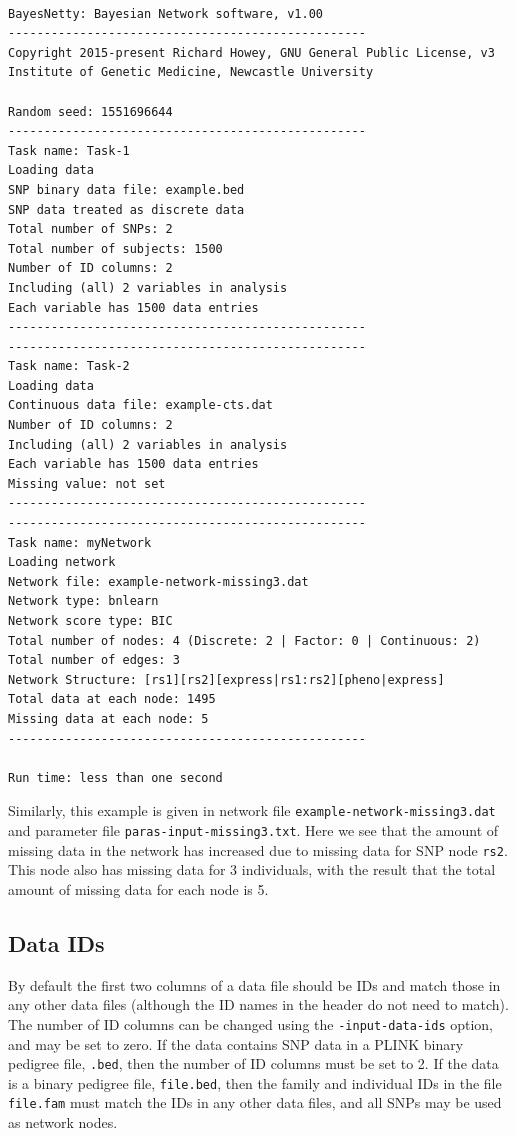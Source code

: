 \documentclass[a4paper,12pt]{article}
\newcommand{\code}[1]{{\footnotesize{{\tt #1}}}}
\begin{document}
\vspace{0.35cm} \begin{lstlisting}

BayesNetty: Bayesian Network software, v1.00
--------------------------------------------------
Copyright 2015-present Richard Howey, GNU General Public License, v3
Institute of Genetic Medicine, Newcastle University

Random seed: 1551696644
--------------------------------------------------
Task name: Task-1
Loading data
SNP binary data file: example.bed
SNP data treated as discrete data
Total number of SNPs: 2
Total number of subjects: 1500
Number of ID columns: 2
Including (all) 2 variables in analysis
Each variable has 1500 data entries
--------------------------------------------------
--------------------------------------------------
Task name: Task-2
Loading data
Continuous data file: example-cts.dat
Number of ID columns: 2
Including (all) 2 variables in analysis
Each variable has 1500 data entries
Missing value: not set
--------------------------------------------------
--------------------------------------------------
Task name: myNetwork
Loading network
Network file: example-network-missing3.dat
Network type: bnlearn
Network score type: BIC
Total number of nodes: 4 (Discrete: 2 | Factor: 0 | Continuous: 2)
Total number of edges: 3
Network Structure: [rs1][rs2][express|rs1:rs2][pheno|express]
Total data at each node: 1495
Missing data at each node: 5
--------------------------------------------------

Run time: less than one second

\end{lstlisting} \vspace{0.35cm}
Similarly, this example is given in network file \code{example-network-missing3.dat} and parameter file \code{paras-input-missing3.txt}. Here we see that the amount of missing data in the network has increased due to missing data for SNP node \code{rs2}. This node also has missing data for 3 individuals, with the result that the total amount of missing data for each node is 5. 


\subsection{Data IDs}
\label{input-data-ids}

By default the first two columns of a data file should be IDs and match those in any other data files (although the ID names in the header do not need to match). The number of ID columns can be changed using the \code{-input-data-ids} option, and may be set to zero. If the data contains SNP data in a PLINK binary pedigree file, \code{.bed}, then the number of ID columns must be set to 2. If the data is a binary pedigree file, \code{file.bed}, then the family and individual IDs in the file \code{file.fam} must match the IDs in any other data files, and all SNPs may be used as network nodes. 
\end{document}
